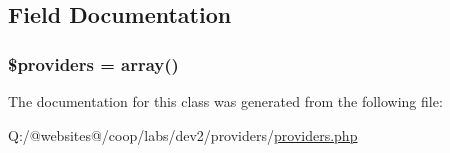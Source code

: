 \subsection{Field Documentation}
\hypertarget{class_providers_a8619fb6079fbd79202034b45724fd6ca}{
\subsubsection[{\$providers}]{\setlength{\rightskip}{0pt plus 5cm}\$providers = array()}}\label{class_providers_a8619fb6079fbd79202034b45724fd6ca}


The documentation for this class was generated from the following file\-:\begin{DoxyCompactItemize}
\item 
Q\-:/@websites@/coop/labs/dev2/providers/\hyperlink{providers_8php}{providers.\-php}\end{DoxyCompactItemize}
